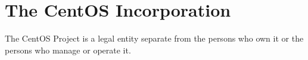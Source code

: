 
\section{The CentOS Incorporation}

The CentOS Project is a legal entity separate from the persons who own
it or the persons who manage or operate it.

